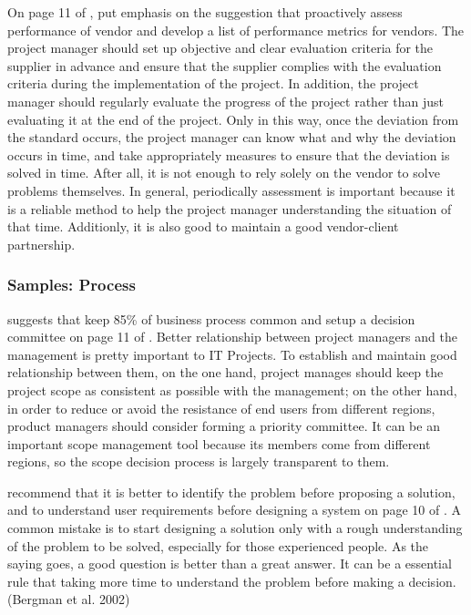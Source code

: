 On page 11 of , \citeauthor{2} put emphasis on the suggestion that proactively assess performance of vendor and develop a list of performance metrics for vendors. The project manager should set up objective and clear evaluation criteria for the supplier in advance and ensure that the supplier complies with the evaluation criteria during the implementation of the project. In addition, the project manager should regularly evaluate the progress of the project rather than just evaluating it at the end of the project. Only in this way, once the deviation from the standard occurs, the project manager can know what and why the deviation occurs in time, and take appropriately measures to ensure that the deviation is solved in time. After all, it is not enough to rely solely on the vendor to solve problems themselves. In general, periodically assessment is important because it is a reliable method to help the project manager understanding the situation of that time. Additionly, it is also good to maintain a good vendor-client partnership.

\subsubsection{Samples: Process}
\citeauthor{2} suggests that keep 85\% of business process common and setup a decision committee on page 11 of . Better relationship between project managers and the management is pretty important to IT Projects. To establish and maintain good relationship between them, on the one hand, project manages should keep the project scope as consistent as possible with the management; on the other hand, in order to reduce or avoid the resistance of end users from different regions, product managers should consider forming a priority committee. It can be an important scope management tool because its members come from different regions, so the scope decision process is largely transparent to them.

\citeauthor{6} recommend that it is better to identify the problem before proposing a solution, and to understand user requirements before designing a system on page 10 of . A common mistake is to start designing a solution only with a rough understanding of the problem to be solved, especially for those experienced people. As the saying goes, a good question is better than a great answer. It can be a essential rule that taking more time to understand the problem before making a decision. (Bergman et al. 2002)

